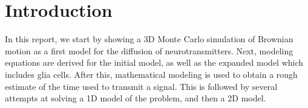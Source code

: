 \section{Introduction}
In this report, we start by showing a 3D Monte Carlo simulation of Brownian motion as a first model for the diffusion of neurotransmitters.  Next, modeling equations are derived for the initial model, as well as the expanded model which includes glia cells.  After this, mathematical modeling is used to obtain a rough estimate of the time used to transmit a signal. This is followed by several attempts at solving a 1D model of the problem, and then a 2D model.

